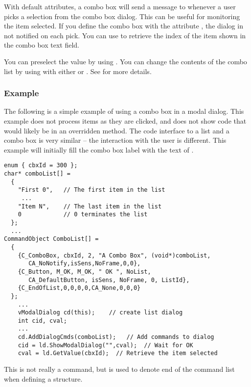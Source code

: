 With default attributes, a combo box will send a message to
 whenever a user picks a selection from the
combo box dialog. This can be useful for monitoring the item
selected. If you define the combo box with the attribute
, the dialog in not notified on each pick.
You can use  to retrieve the index of the
item shown in the combo box text field.

You can preselect the value by using .
You can change the contents of the combo list by using 
 with either   or
. See  for more
details.

\subsubsection* {Example}

The following is a simple example of using a combo box in a modal
dialog.  This example does not process items as they are clicked,
and does not show code that would likely be in an overridden
 method. The code interface to a list and a
combo box is very similar -- the interaction with the user is
different. This example will initially fill the combo box label
with the text of  .

\footnotesize
\begin{verbatim}
enum { cbxId = 300 };
char* comboList[] =
  {
    "First 0",   // The first item in the list
     ...
    "Item N",    // The last item in the list
    0            // 0 terminates the list
  };
  ...
CommandObject ComboList[] =
  {
    {C_ComboBox, cbxId, 2, "A Combo Box", (void*)comboList,
       CA_NoNotify,isSens,NoFrame,0,0},
    {C_Button, M_OK, M_OK, " OK ", NoList,
       CA_DefaultButton, isSens, NoFrame, 0, ListId},
    {C_EndOfList,0,0,0,0,CA_None,0,0,0}
  };
    ...
    vModalDialog cd(this);    // create list dialog
    int cid, cval;
    ...
    cd.AddDialogCmds(comboList);   // Add commands to dialog
    cid = ld.ShowModalDialog("",cval);  // Wait for OK
    cval = ld.GetValue(cbxId);  // Retrieve the item selected
\end{verbatim}
\normalfont\normalsize


This is not really a command, but is used to denote end of the
command list when defining a  structure.

